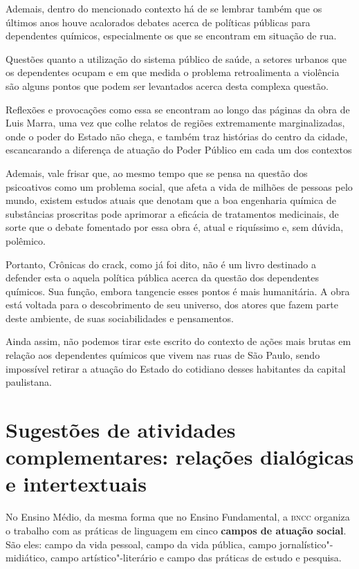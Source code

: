 \documentclass[11pt]{extarticle}
\begin{document}
Ademais, dentro do mencionado contexto há de se lembrar também que os
últimos anos houve acalorados debates acerca de políticas públicas para
dependentes químicos, especialmente os que se encontram em situação de
rua.

Questões quanto a utilização do sistema público de saúde, a setores
urbanos que os dependentes ocupam e em que medida o problema
retroalimenta a violência são alguns pontos que podem ser levantados
acerca desta complexa questão.

Reflexões e provocações como essa se encontram ao longo das páginas da
obra de Luis Marra, uma vez que colhe relatos de regiões extremamente
marginalizadas, onde o poder do Estado não chega, e também traz
histórias do centro da cidade, escancarando a diferença de atuação do
Poder Público em cada um dos contextos

Ademais, vale frisar que, ao mesmo tempo que se pensa na questão dos
psicoativos como um problema social, que afeta a vida de milhões de
pessoas pelo mundo, existem estudos atuais que denotam que a boa
engenharia química de substâncias proscritas pode aprimorar a eficácia
de tratamentos medicinais, de sorte que o debate fomentado por essa obra
é, atual e riquíssimo e, sem dúvida, polêmico.

Portanto, Crônicas do crack, como já foi dito, não é um livro destinado
a defender esta o aquela política pública acerca da questão dos
dependentes químicos. Sua função, embora tangencie esses pontos é mais
humanitária. A obra está voltada para o descobrimento de seu universo,
dos atores que fazem parte deste ambiente, de suas sociabilidades e
pensamentos.

Ainda assim, não podemos tirar este escrito do contexto de ações mais
brutas em relação aos dependentes químicos que vivem nas ruas de São
Paulo, sendo impossível retirar a atuação do Estado do cotidiano desses
habitantes da capital paulistana.


\section{Sugestões de atividades complementares: relações dialógicas e
intertextuais}


No Ensino Médio, da mesma forma que no Ensino Fundamental, a \textsc{bncc}
organiza o trabalho com as práticas de linguagem em cinco \textbf{campos
de atuação social}. São eles: campo da vida pessoal, campo da vida
pública, campo jornalístico"-midiático, campo artístico"-literário e campo
das práticas de estudo e pesquisa.
\end{document}
